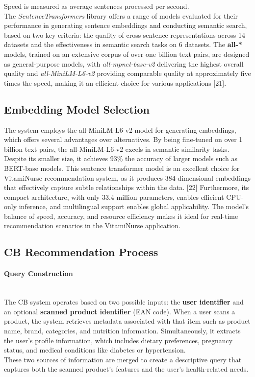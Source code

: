 Speed is measured as average
sentences processed per second.
\\
 The \textit{SentenceTransformers} library offers a range of models evaluated for
their performance in generating sentence embeddings and conducting
semantic search, based on two key criteria: the quality of cross-sentence
representations across 14 datasets and the effectiveness in semantic search
tasks on 6 datasets.
The \textbf{all-*} models, trained on an extensive corpus of over one billion text
pairs, are designed as general-purpose models, with \textit{all-mpnet-base-v2} delivering the highest overall quality and \textit{all-MiniLM-L6-v2} providing comparable quality at approximately five times the speed, making it an
efficient choice for various applications [21].


\subsection{Embedding Model Selection}
The system employs the all-MiniLM-L6-v2 model for generating embeddings, which offers several advantages over alternatives. By being
fine-tuned on over 1 billion text pairs, the all-MiniLM-L6-v2 excels in
semantic similarity tasks. Despite its smaller size, it achieves 93\% the
accuracy of larger models such as BERT-base models.
This sentence transformer model is an excellent choice for VitamiNurse
recommendation system, as it produces 384-dimensional embeddings that
effectively capture subtle relationships within the data. [22] Furthermore,
its compact architecture, with only 33.4 million parameters, enables
efficient CPU-only inference, and multilingual support enables global
applicability. The model’s balance of speed, accuracy, and resource
efficiency makes it ideal for real-time recommendation scenarios in the
VitamiNurse application.
\subsection{CB Recommendation Process}

\paragraph{Query Construction}
\\
The CB system operates based on two possible inputs: the \textbf{user identifier}
and an optional \textbf{scanned product identifier} (EAN code). When a
user scans a product, the system retrieves metadata associated with that
item such as product name, brand, categories, and nutrition information.
Simultaneously, it extracts the user’s profile information, which includes
dietary preferences, pregnancy status, and medical conditions like diabetes
or hypertension.\\
These two sources of information are merged to create a descriptive
query that captures both the scanned product’s features and the user’s
health-related needs.

